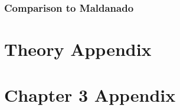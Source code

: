 \documentclass[12pt]{uthesis-v12}  %
\begin{document}
\subsection{Comparison to Maldanado}



\appendix
\chapter{Theory Appendix}

\chapter{Chapter 3 Appendix}
%




\end{document}
